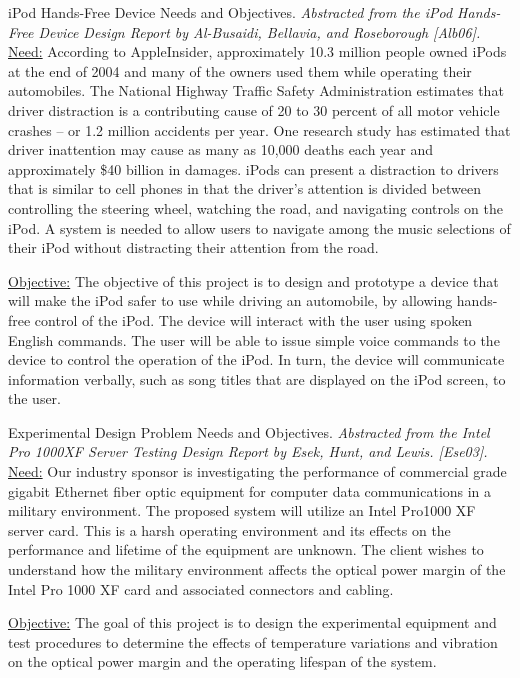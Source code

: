 \begin{example}{iPod Hands-Free Device Needs and Objectives.
\emph{Abstracted from the iPod Hands-Free Device Design Report by
Al-Busaidi, Bellavia, and Roseborough {[}Alb06{]}. }}
\label{example:iPodNeeds}
\ul{Need:} According to AppleInsider, approximately 10.3 million people
owned iPods at the end of 2004 and many of the owners used them while
operating their automobiles. The National Highway Traffic Safety
Administration estimates that driver distraction is a contributing cause
of 20 to 30 percent of all motor vehicle crashes -- or 1.2 million
accidents per year. One research study has estimated that driver
inattention may cause as many as 10,000 deaths each year and
approximately \$40 billion in damages. iPods can present a distraction
to drivers that is similar to cell phones in that the driver's attention
is divided between controlling the steering wheel, watching the road,
and navigating controls on the iPod. A system is needed to allow users
to navigate among the music selections of their iPod without distracting
their attention from the road.

\ul{Objective:} The objective of this project is to design and prototype
a device that will make the iPod safer to use while driving an
automobile, by allowing hands-free control of the iPod. The device will
interact with the user using spoken English commands. The user will be
able to issue simple voice commands to the device to control the
operation of the iPod. In turn, the device will communicate information
verbally, such as song titles that are displayed on the iPod screen, to
the user.
\end{example}

\begin{example}{Experimental Design Problem Needs and Objectives.
\emph{Abstracted from the Intel Pro 1000XF Server Testing Design Report
by Esek, Hunt, and Lewis. {[}Ese03{]}. }}
\label{example:intelProNeeds}
\ul{Need:} Our industry sponsor is investigating the performance of
commercial grade gigabit Ethernet fiber optic equipment for computer
data communications in a military environment. The proposed system will
utilize an Intel Pro1000 XF server card. This is a harsh operating
environment and its effects on the performance and lifetime of the
equipment are unknown. The client wishes to understand how the military
environment affects the optical power margin of the Intel Pro 1000 XF
card and associated connectors and cabling.

\ul{Objective:} The goal of this project is to design the experimental
equipment and test procedures to determine the effects of temperature
variations and vibration on the optical power margin and the operating
lifespan of the system.
\end{example}

